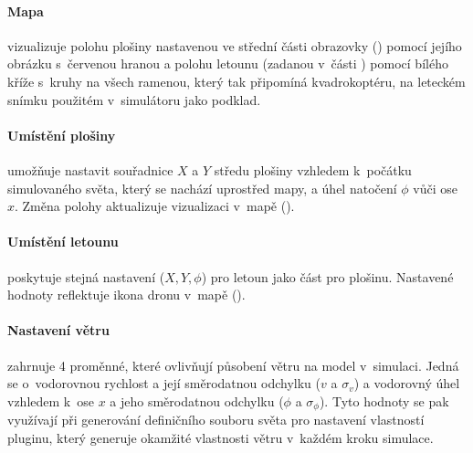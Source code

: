     \paragraph{ Mapa}vizualizuje polohu plošiny nastavenou ve střední části obrazovky () pomocí jejího obrázku s~červenou hranou a polohu letounu (zadanou v~části ) pomocí bílého kříže s~kruhy na všech ramenou, který tak připomíná kvadrokoptéru, na leteckém snímku použitém v~simulátoru jako podklad.

    \paragraph{ Umístění plošiny} umožňuje nastavit souřadnice $X$ a $Y$ středu plošiny vzhledem k~počátku simulovaného světa, který se nachází uprostřed mapy, a úhel natočení $\phi$ vůči ose $x$. Změna polohy aktualizuje vizualizaci v~mapě ().

    \paragraph{ Umístění letounu} poskytuje stejná nastavení ($X, Y, \phi$) pro letoun jako část  pro plošinu. Nastavené hodnoty reflektuje ikona dronu v~mapě ().

    \paragraph{ Nastavení větru} zahrnuje 4 proměnné, které ovlivňují působení větru na model v~simulaci. Jedná se o~vodorovnou rychlost a její směrodatnou odchylku ($v$ a $\sigma_v$) a vodorovný úhel vzhledem k~ose $x$ a jeho směrodatnou odchylku ($\phi$ a $\sigma_\phi$). Tyto hodnoty se pak využívají při generování definičního souboru světa pro nastavení vlastností pluginu, který generuje okamžité vlastnosti větru v~každém kroku simulace.

